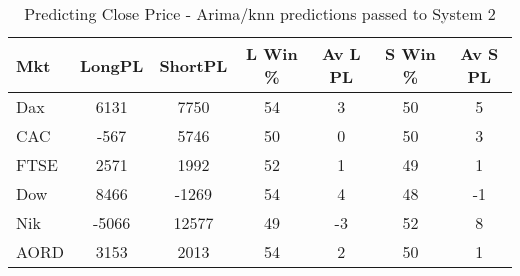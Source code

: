 \begin{table}[ht]
\centering
\caption[Predicting Close Price - Arima/knn predictions passed to System 2]{Predicting Close Price - Arima/knn predictions passed to System 2} 
\label{tab:chp_ts:pred_close_arima_knn_sys2}
\begin{tabular}{lcccccc}
  \toprule Mkt & LongPL & ShortPL & L Win \% & Av L PL & S Win \% & Av S PL \\ 
  \midrule Dax & 6131 & 7750 & 54 & 3 & 50 & 5 \\ 
  CAC & -567 & 5746 & 50 & 0 & 50 & 3 \\ 
  FTSE & 2571 & 1992 & 52 & 1 & 49 & 1 \\ 
  Dow & 8466 & -1269 & 54 & 4 & 48 & -1 \\ 
  Nik & -5066 & 12577 & 49 & -3 & 52 & 8 \\ 
  AORD & 3153 & 2013 & 54 & 2 & 50 & 1 \\ 
   \bottomrule \end{tabular}
\end{table}
